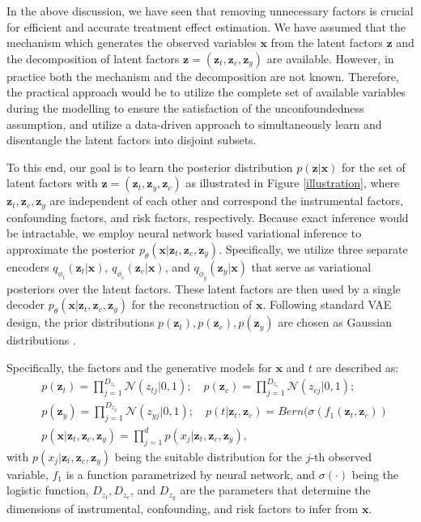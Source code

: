 \documentclass[letterpaper]{article} %
\begin{document}
In the above discussion, we have seen that removing unnecessary factors is crucial for efficient and accurate treatment effect estimation. We have assumed that the mechanism which generates the observed variables $\mathbf{x}$ from the latent factors $\mathbf{z}$ and the decomposition of latent factors $\mathbf{z} = (\mathbf{z}_t, \mathbf{z}_c, \mathbf{z}_y)$ are available.
However, in practice both the mechanism and the decomposition are not known. Therefore, the practical approach would be to utilize the complete set of available variables during the modelling to ensure the satisfaction of the unconfoundedness assumption, and utilize a data-driven approach to simultaneously learn and disentangle the latent factors into disjoint subsets.

To this end, our goal is to learn the posterior distribution $p(\mathbf{z}|\mathbf{x})$ for the set of latent factors  with $\mathbf{z}= (\mathbf{z}_t, \mathbf{z}_y, \mathbf{z}_c)$ as illustrated in Figure \ref{illustration}, where $\mathbf{z}_t,\mathbf{z}_c, \mathbf{z}_y$ are independent of each other and correspond the instrumental factors, confounding factors, and risk factors, respectively.
Because exact inference would be intractable, we employ neural network based variational inference to approximate the posterior $p_\theta(\mathbf{x}|\mathbf{z}_t, \mathbf{z}_c, \mathbf{z}_y)$. Specifically, we utilize three separate encoders $q_{\phi_t}(\mathbf{z}_t|\mathbf{x})$, $q_{\phi_c}(\mathbf{z}_c|\mathbf{x})$, and $q_{\phi_y}(\mathbf{z}_y|\mathbf{x})$ that serve as variational posteriors over the latent factors.
These latent factors are then used by a single decoder $p_\theta(\mathbf{x}|\mathbf{z}_t,\mathbf{z}_c, \mathbf{z}_y)$ for the reconstruction of $\mathbf{x}$. Following standard VAE design, the prior distributions $p(\mathbf{z}_t),p(\mathbf{z}_c),p(\mathbf{z}_y)$ are chosen as Gaussian distributions \cite{Kingma2014}.

Specifically, the factors and the generative models for $\mathbf{x}$ and $t$ are described as:
\begin{align}
&p(\mathbf{z}_t) = \prod\limits_{j=1}^{D_{z_t}} \mathcal{N}(z_{tj}|0,1);\quad
p(\mathbf{z}_c) = \prod\limits_{j=1}^{D_{z_c}} \mathcal{N}(z_{cj}|0,1); \nonumber\\
&p(\mathbf{z}_y) = \prod\limits_{j=1}^{D_{z_y}} \mathcal{N}(z_{yj}|0,1);\quad p(t|\mathbf{z}_t,\mathbf{z}_c) = Bern(\sigma(f_1(\mathbf{z}_t,\mathbf{z}_c))\nonumber\\
& p(\mathbf{x}|\mathbf{z}_t,\mathbf{z}_c, \mathbf{z}_y) = \prod\limits_{j=1}^{d} p(x_j|\mathbf{z}_t,\mathbf{z}_c, \mathbf{z}_y),
\end{align}
with $p(x_j|\mathbf{z}_t,\mathbf{z}_c, \mathbf{z}_y)$ being the suitable distribution for the $j$-th observed variable, $f_1$ is a function parametrized by neural network, and $\sigma(\cdot)$ being the logistic function, $D_{z_t},D_{z_c}$, and $D_{z_y}$ are the parameters that determine the dimensions of instrumental, confounding, and risk factors to infer from $\mathbf{x}$.
\end{document}
